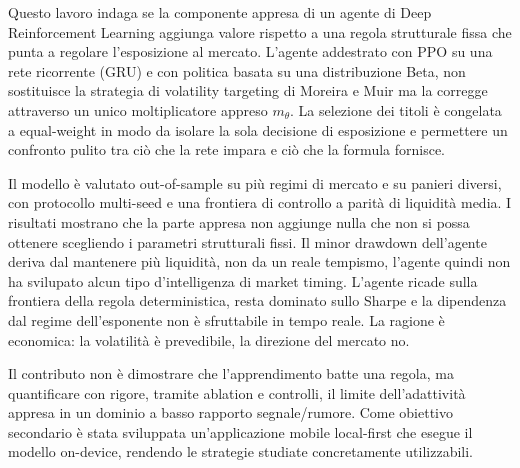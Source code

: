 Questo lavoro indaga se la componente appresa di un agente di Deep Reinforcement Learning aggiunga valore rispetto a una regola strutturale fissa che punta a regolare l'esposizione al mercato. 
L'agente addestrato con PPO su una rete ricorrente (GRU) e con politica basata su una distribuzione Beta, non sostituisce la strategia di volatility targeting di Moreira e Muir ma la corregge attraverso un unico moltiplicatore appreso $m_\theta$.
La selezione dei titoli è congelata a equal-weight in modo da isolare la sola decisione di esposizione e permettere un confronto pulito tra ciò che la rete impara e ciò che la formula fornisce.

Il modello è valutato out-of-sample su più regimi di mercato e su panieri diversi, con protocollo multi-seed e una frontiera di controllo a parità di liquidità media. 
I risultati mostrano che la parte appresa non aggiunge nulla che non si possa ottenere scegliendo i parametri strutturali fissi. 
Il minor drawdown dell'agente deriva dal mantenere più liquidità, non da un reale tempismo, l'agente quindi non ha svilupato alcun tipo d'intelligenza di market timing. 
L'agente ricade sulla frontiera della regola deterministica, resta dominato sullo Sharpe e la dipendenza dal regime dell'esponente non è sfruttabile in tempo reale.
La ragione è economica: la volatilità è prevedibile, la direzione del mercato no.

Il contributo non è dimostrare che l'apprendimento batte una regola, ma quantificare con rigore, tramite ablation e controlli, il limite dell'adattività appresa in un dominio a basso rapporto segnale/rumore. 
Come obiettivo secondario è stata sviluppata un'applicazione mobile local-first che esegue il modello on-device, rendendo le strategie studiate concretamente utilizzabili.

